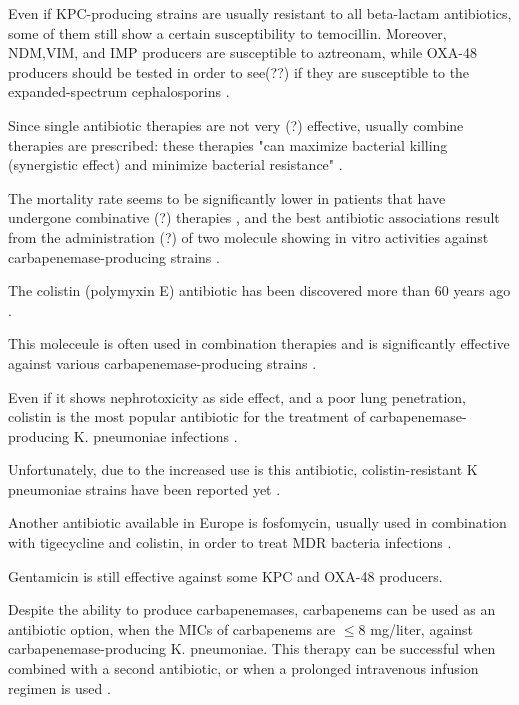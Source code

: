 \documentclass[11pt]{report}
\begin{document}
Even if KPC-producing strains are usually resistant to all beta-lactam antibiotics, some of them still show a certain susceptibility to temocillin. 
Moreover, NDM,VIM, and IMP producers are susceptible to aztreonam, while
OXA-48 producers should be tested in order to see(??) if they are susceptible to the expanded-spectrum cephalosporins \cite{girlich2009ctx}.

Since single antibiotic therapies are not very (?) effective, usually combine therapies are prescribed: these therapies "can maximize bacterial killing (synergistic effect) and minimize bacterial resistance" \cite{Pitout2015}.

The mortality rate seems to be significantly lower in patients that have undergone combinative (?) therapies \cite{tzouvelekis2014treating, zavascki2013combination}, and the best antibiotic associations result from the administration (?) of two molecule showing in vitro activities against carbapenemase-producing strains \cite{falagas2013antibiotic, tzouvelekis2014treating}. 

The colistin (polymyxin E) antibiotic has been discovered more than 60 years ago \cite{karaiskos2014multidrug, rodriguez2015diagnosis}.

This moleceule is often used in combination therapies and is significantly effective against various carbapenemase-producing strains \cite{falagas2013antibiotic, temkin2014carbapenem}.

Even if it shows nephrotoxicity as side effect, and a poor lung penetration, colistin is the most popular antibiotic for the treatment of carbapenemase-producing K. pneumoniae infections \cite{karaiskos2014multidrug, rodriguez2015diagnosis}. 

Unfortunately, due to the increased use is this antibiotic, 
colistin-resistant K pneumoniae strains have been reported yet \cite{mammina2012ongoing}.

Another antibiotic available in Europe is fosfomycin, usually used in combination with tigecycline and colistin, in order to treat MDR bacteria infections \cite{pontikis2014outcomes}.

Gentamicin is still effective against some KPC and OXA-48
producers.

Despite the ability to produce carbapenemases, carbapenems can be used as an antibiotic option, when the MICs of carbapenems are $\le 8$ mg/liter, against carbapenemase-producing K. pneumoniae. This therapy can be successful when combined with a second antibiotic, or when a prolonged intravenous infusion regimen is used \cite{tzouvelekis2014treating, daikos2014carbapenemase, tumbarello2012predictors}.
\end{document}
